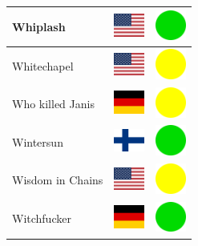 \documentclass[12pt, a4paper, twoside]{report}
\begin{document}
\begin{center}
\begin{longtable}{|p{5cm}|p{2cm}|p{2cm}|}
 Whiplash                                                   & \includegraphics[width=1cm]{../4x3/us} &   \includegraphics[width=1cm]{../likes/y} \\ \hline
 Whitechapel                                                & \includegraphics[width=1cm]{../4x3/us} &   \includegraphics[width=1cm]{../likes/m} \\ \hline
 Who killed Janis                                           & \includegraphics[width=1cm]{../4x3/de} &   \includegraphics[width=1cm]{../likes/m} \\ \hline
 Wintersun                                                  & \includegraphics[width=1cm]{../4x3/fi} &   \includegraphics[width=1cm]{../likes/y} \\ \hline
 Wisdom in Chains                                           & \includegraphics[width=1cm]{../4x3/us} &   \includegraphics[width=1cm]{../likes/m} \\ \hline
 Witchfucker                                                & \includegraphics[width=1cm]{../4x3/de} &   \includegraphics[width=1cm]{../likes/y} \\ \hline

\end{longtable}
\end{center}
\end{document}
